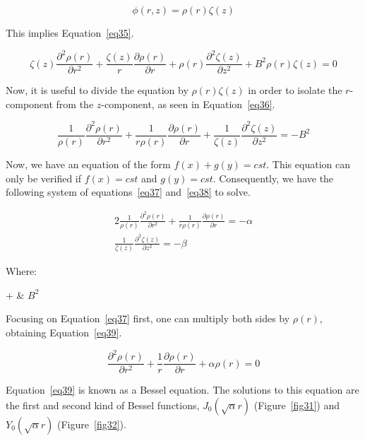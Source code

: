 \begin{equation}\label{eq34}
\phi(r, z) = \rho(r)\zeta(z)
\end{equation}

This implies Equation~\ref{eq35}.


\begin{equation}\label{eq35}
\zeta(z)\frac{\partial^2 \rho(r)}{\partial r^2} + \frac{\zeta(z)}{r}\frac{\partial \rho(r)}{\partial r} + \rho(r)\frac{\partial^2 \zeta(z)}{\partial z^2} + B^2\rho(r)\zeta(z) = 0
\end{equation}

Now, it is useful to divide the equation by $\rho(r)\zeta(z)$ in order to isolate the $r$-component from the $z$-component, as seen in Equation~\ref{eq36}.


\begin{equation}\label{eq36}
\frac{1}{\rho(r)}\frac{\partial^2 \rho(r)}{\partial r^2} + \frac{1}{r\rho(r)}\frac{\partial \rho(r)}{\partial r} + \frac{1}{\zeta(z)}\frac{\partial^2 \zeta(z)}{\partial z^2} = -B^2
\end{equation}

Now, we have an equation of the form $f(x) + g(y) = cst$. This equation can only be verified if $f(x) = cst$ and $g(y) = cst$. Consequently, we have the following system of equations~\ref{eq37} and~\ref{eq38} to solve.

\begin{alignat}{2}
\frac{1}{\rho(r)}\frac{\partial^2 \rho(r)}{\partial r^2} + \frac{1}{r\rho(r)}\frac{\partial \rho(r)}{\partial r} = -\alpha \label{eq37} \\     \frac{1}{\zeta(z)}\frac{\partial^2 \zeta(z)}{\partial z^2} = -\beta \label{eq38}
\end{alignat}

Where:

\begin{conditions}
\alpha + \beta & $B^2$
\end{conditions}

Focusing on Equation~\ref{eq37} first, one can multiply both sides by $\rho(r)$, obtaining Equation~\ref{eq39}.

\begin{equation}\label{eq39}
\frac{\partial^2 \rho(r)}{\partial r^2} + \frac{1}{r}\frac{\partial \rho(r)}{\partial r} + \alpha\rho(r) = 0
\end{equation}

Equation~\ref{eq39} is known as a Bessel equation. The solutions to this equation are the first and second kind of Bessel functions, $J_0(\sqrt{\alpha}r)$ (Figure~\ref{fig31}) and $Y_0(\sqrt{\alpha}r)$ (Figure~\ref{fig32}).

